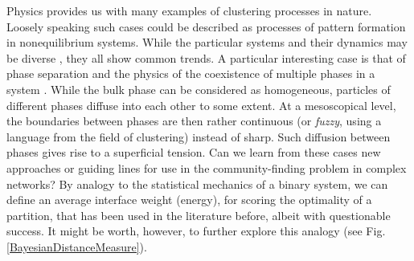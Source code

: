 \documentclass[twocolumn,aps,sort,nofootinbib]{revtex4}
\begin{document}
Physics provides us with many examples of 
clustering processes in nature. 
Loosely speaking such cases could 
be described as 
processes of 
pattern formation in nonequilibrium systems.
While the particular systems and their
dynamics may be diverse \cite{Cross93,SanchoLibro},
they all show common trends. A particular
interesting case is that of phase separation
and the physics of the coexistence of multiple phases
in a system \cite{Prigogine51-B}. While 
the bulk phase can be considered as homogeneous,
particles of different phases diffuse into each other
to some extent. At a mesoscopical level, the
boundaries between phases are then rather continuous
(or {\em fuzzy}, using a language from the field
of clustering) instead of sharp. Such diffusion between phases
gives rise to a superficial tension.
Can we learn from these cases new approaches
or guiding lines for use in the community-finding problem in
complex networks? 
By analogy to the statistical mechanics of a binary
system, we can define an average interface weight
(energy), for scoring the optimality of a partition,
that has been used in the literature before,
albeit with questionable success. It might be
worth, however, to further explore this analogy (see Fig. \ref{BayesianDistanceMeasure}). 
\end{document}
